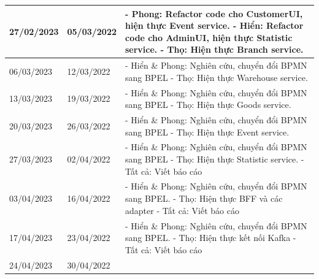 {\begin{longtable}{| p{2cm} | p{2cm} | p{10cm} |}
	  \hline
	  27/02/2023       & 05/03/2022   &
	  - Phong: Refactor code cho CustomerUI, hiện thực Event service.
	  \newline
	  - Hiển: Refactor code cho AdminUI, hiện thực Statistic service.
	  \newline
	  - Thọ: Hiện thực Branch service.                                                                 \\
	  \hline
	  06/03/2023       & 12/03/2022   &
	  - Hiển           \& Phong: Nghiên cứu, chuyển đổi BPMN sang BPEL
	  \newline
	  - Thọ: Hiện thực Warehouse service.                                                              \\
	  \hline
	  13/03/2023       & 19/03/2022   &
	  - Hiển           \& Phong: Nghiên cứu, chuyển đổi BPMN sang BPEL
	  \newline
	  - Thọ: Hiện thực Goods service.                                                                  \\
	  \hline
	  20/03/2023       & 26/03/2022   &
	  - Hiển           \& Phong: Nghiên cứu, chuyển đổi BPMN sang BPEL
	  \newline
	  - Thọ: Hiện thực Event service.                                                                  \\
	  \hline
	  27/03/2023       & 02/04/2022   &
	  - Hiển           \& Phong: Nghiên cứu, chuyển đổi BPMN sang BPEL
	  \newline
	  - Thọ: Hiện thực Statistic service.
	  \newline
	  - Tất cả: Viết báo cáo                                                                           \\
	  \hline
	  03/04/2023       & 16/04/2022   &
	  - Hiển           \& Phong: Nghiên cứu, chuyển đổi BPMN sang BPEL.
	  \newline
	  - Thọ: Hiện thực BFF và các adapter
	  \newline
	  - Tất cả: Viết báo cáo                                                                           \\
	  \hline
	  17/04/2023       & 23/04/2022   &
	  - Hiển           \& Phong: Nghiên cứu, chuyển đổi BPMN sang BPEL.
	  \newline
	  - Thọ: Hiện thực kết nối Kafka
	  \newline
	  - Tất cả: Viết báo cáo                                                                           \\
	  \hline
	  24/04/2023       & 30/04/2022   &

\end{longtable}}
